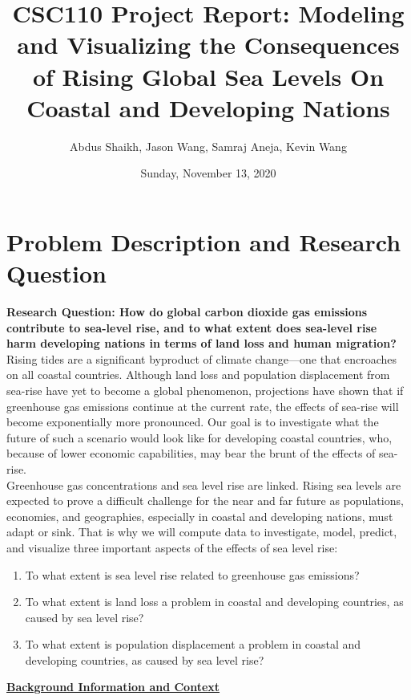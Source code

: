 \documentclass[fontsize=11pt]{article}
\title{CSC110 Project Report: Modeling and Visualizing the Consequences of Rising Global Sea Levels On Coastal and Developing Nations}
\author{Abdus Shaikh, Jason Wang, Samraj Aneja, Kevin Wang}
\date{Sunday, November 13, 2020}
\begin{document}
\maketitle

\section*{Problem Description and Research Question}

\textbf{Research Question: How do global carbon dioxide gas emissions contribute to sea-level rise, and to what extent does sea-level rise harm developing nations in terms of land loss and human migration?}\\


Rising tides are a significant byproduct of climate change—one that encroaches on all coastal countries. Although land loss and population displacement from sea-rise have yet to become a global phenomenon, projections have shown that if greenhouse gas emissions continue at the current rate, the effects of sea-rise will become exponentially more pronounced. Our goal is to investigate what the future of such a scenario would look like for developing coastal countries, who, because of lower economic capabilities, may bear the brunt of the effects of sea-rise.\\

Greenhouse gas concentrations and sea level rise are linked. Rising sea levels are expected to prove a difficult challenge for the near and far future as populations, economies, and geographies, especially in coastal and developing nations, must adapt or sink. That is why we will compute data to investigate, model, predict, and visualize three important aspects of the effects of sea level rise:

\begin{enumerate}
    \item To what extent is sea level rise related to greenhouse gas emissions?
    \item To what extent is land loss a problem in coastal and developing countries, as caused by sea level rise?
    \item To what extent is population displacement a problem in coastal and developing countries, as caused by sea level rise?
\end{enumerate}

\underline{\textbf{Background Information and Context}}\\
\end{document}
